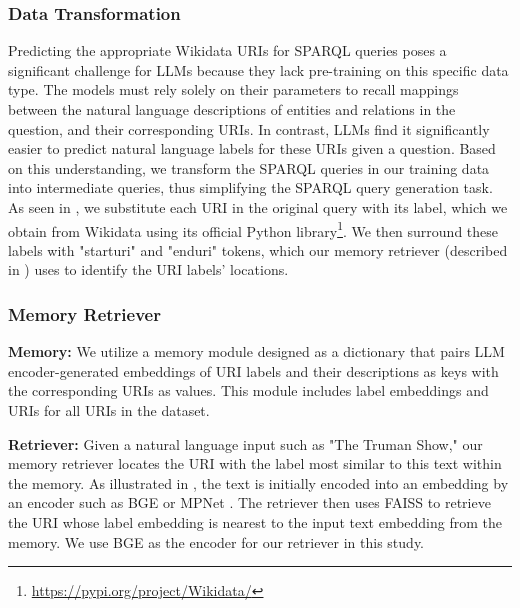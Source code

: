 \subsubsection{Data Transformation}
\label{sec:transform}
Predicting the appropriate Wikidata URIs for SPARQL queries poses a significant challenge for LLMs because they lack pre-training on this specific data type.
The models must rely solely on their parameters to recall mappings between the natural language descriptions of entities and relations in the question, and their corresponding URIs.
In contrast, LLMs find it significantly easier to predict natural language labels for these URIs given a question.
Based on this understanding, we transform the SPARQL queries in our training data into intermediate queries, thus simplifying the SPARQL query generation task.
As seen in , we substitute each URI in the original query with its label, which we obtain from Wikidata using its official Python library\footnote{\url{https://pypi.org/project/Wikidata/}}.
We then surround these labels with "starturi" and "enduri" tokens, which our memory retriever (described in )  uses to identify the URI labels' locations.



\subsubsection{Memory Retriever}
\label{sec:retriever}
\noindent \textbf{Memory:} We utilize a memory module designed as a dictionary that pairs LLM encoder-generated embeddings of URI labels and their descriptions as keys with the corresponding URIs as values. This module includes label embeddings and URIs for all URIs in the dataset.


\noindent \textbf{Retriever:} Given a natural language input such as "The Truman Show," our memory retriever locates the URI with the label most similar to this text within the memory. 
As illustrated in , the text is initially encoded into an embedding by an encoder such as BGE \citep{chen2024bge} or MPNet \citep{mpnet}.
The retriever then uses FAISS \citep{faiss_lib,faiss_gpu} to retrieve the URI whose label embedding is nearest to the input text embedding from the memory.
We use BGE as the encoder for our retriever in this study.

